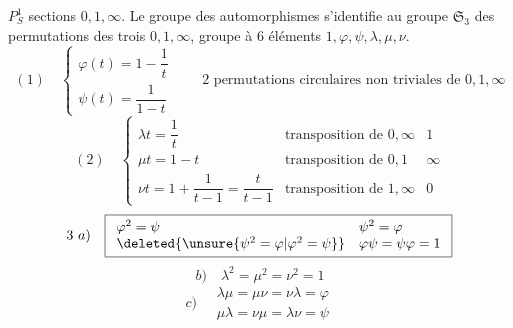 
$P^1_S$ sections $0,1,\infty$. Le groupe des automorphismes s'identifie au groupe $\mathfrak S_3$ des permutations des trois  $0,1,\infty$, groupe à $6$ éléments $1,\varphi,\psi,\lambda,\mu,\nu$.
\[
(1)\quad\left\{\begin{array}{l}\varphi(t)=1-\dfrac1t\\\psi(t)=\dfrac1{1-t}\end{array}\right.
\qquad\text{2 permutations circulaires non triviales de }0,1,\infty
\]
\[
(2)\quad\left\{\begin{array}{ll||l}
\lambda t=\dfrac1t&\text{transposition de }0,\infty&1\\
\mu t=1-t&\text{transposition de }0,1&\infty\\
\nu t=1+\dfrac1{t-1}=\dfrac t{t-1}&\text{transposition de }1,\infty&0
\end{array}\right.
\]
\[
3\ a)\quad\boxed{\begin{array}{ll}\varphi^2=\psi&\psi^2=\varphi\\\deleted{\unsure{\psi^2=\varphi|\varphi^2=\psi}}&\varphi\psi=\psi\varphi=1\end{array}}
\]
\[
b)\quad\boxed{\lambda^2=\mu^2=\nu^2=1}
\]
\[
c)\quad\boxed{\begin{array}{l}\lambda\mu=\mu\nu=\nu\lambda=\varphi\\\mu\lambda=\nu\mu=\lambda\nu=\psi\end{array}}
\]

